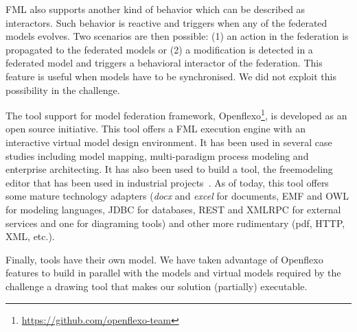 FML also supports another kind of behavior which can be described as
interactors. Such behavior is reactive and triggers when any of the
federated models evolves. Two scenarios are then possible: (1) an
action in the federation is propagated to the federated models or (2)
a modification is detected in a federated model and triggers a
behavioral interactor of the federation.
This feature is useful when models have to be synchronised. We did not
exploit this possibility in the challenge.

The tool support for model federation framework,
Openflexo\footnote{\url{https://github.com/openflexo-team}}, is
developed as an open source initiative. This tool offers a FML
execution engine with an interactive virtual model design environment.
It has been used in several case studies including model mapping,
multi-paradigm process modeling and enterprise architecting. It has
also been used to build a tool, the freemodeling editor that has been
used in industrial projects~\cite{models2016}. As of today, this tool
offers some mature technology adapters (\emph{docx} and \emph{excel}
for documents, EMF and OWL for modeling languages, JDBC for databases,
REST and XMLRPC for external services and one for diagraming tools)
and other more rudimentary (pdf, HTTP, XML, etc.).

Finally, tools have their own model. We have taken advantage of
Openflexo features to build in parallel with the models and virtual
models required by the challenge a drawing tool that makes our
solution (partially) executable.

